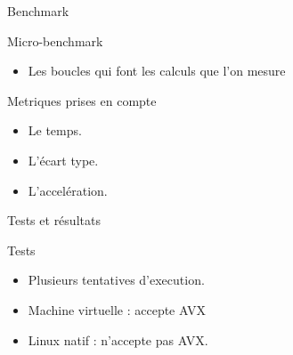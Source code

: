 \documentclass{beamer}
\begin{document}
\begin{frame}{Benchmark}

  \begin{block}{Micro-benchmark}
    \begin{itemize}
    \item Les boucles qui font les calculs que l'on mesure 
    \end{itemize}
  \end{block}

  \begin{block}{Metriques prises en compte}
    \begin{itemize}
    \item Le temps.
    \item L'écart type.
    \item L'accelération.
    \end{itemize}
  \end{block}

\end{frame}

\begin{frame}{Tests et résultats}

  \begin{block}{Tests}
    \begin{itemize}
    \item Plusieurs tentatives d'execution.
    \item Machine virtuelle : accepte AVX
    \item Linux natif : n'accepte pas AVX.
    \end{itemize}
  \end{block}

\end{frame}
\end{document}

